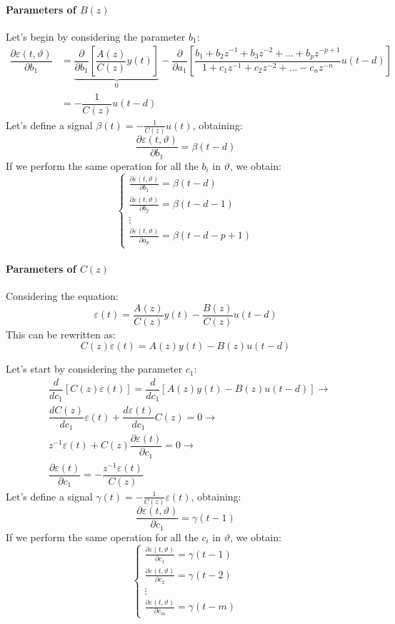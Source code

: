 \paragraph*{Parameters of $B(z)$}
Let's begin by considering the parameter $b_1$:
\begin{align*}
    \dfrac{\partial\varepsilon(t,\vartheta)}{\partial b_1}  &=\underbrace{\dfrac{\partial}{\partial b_1}\left[ \dfrac{A(z)}{C(z)}y(t)\right]}_0 - \dfrac{\partial}{\partial a_1}\left[\dfrac{b_1+b_2z^{-1}+b_3z^{-2}+\dots+b_pz^{-p+1}}{1+c_1z^{-1}+c_2z^{-2}+\dots-c_nz^{-n}}u(t-d)\right] \\        
                                                            &=-\dfrac{1}{C(z)}u(t-d)
\end{align*}
Let's define a signal $\beta(t)=-\frac{1}{C(z)}u(t)$, obtaining: 
\[\dfrac{\partial\varepsilon(t,\vartheta)}{\partial b_1}=\beta(t-d)\]
If we perform the same operation for all the $b_i$ in $\vartheta$, we obtain:
\[\begin{cases}
    \frac{\partial\varepsilon(t,\vartheta)}{\partial b_1}=\beta(t-d) \\
    \frac{\partial\varepsilon(t,\vartheta)}{\partial b_2}=\beta(t-d-1) \\
    \vdots \\
    \frac{\partial\varepsilon(t,\vartheta)}{\partial a_p}=\beta(t-d-p+1)
\end{cases}\]

\paragraph*{Parameters of $C(z)$}
Considering the equation:
\[\varepsilon(t)=\dfrac{A(z)}{C(z)}y(t)-\dfrac{B(z)}{C(z)}u(t-d)\]
This can be rewritten as: 
\[C(z)\varepsilon(t)=A(z)y(t)-B(z)u(t-d)\]

Let's start by considering the parameter $c_1$:
\begin{align*}
    &\dfrac{d}{d c_1}\left[ C(z)\varepsilon(t) \right]=\dfrac{d}{dc_1}\left[ A(z)y(t)-B(z)u(t-d) \right] \rightarrow \\
    &\dfrac{dC(z)}{d c_1}\varepsilon(t) + \dfrac{d\varepsilon(t)}{d c_1}C(z)= 0 \rightarrow \\
    &z^{-1}\varepsilon(t)+C(z)\dfrac{\partial\varepsilon(t)}{\partial c_1} = 0 \rightarrow \\
    &\dfrac{\partial\varepsilon(t)}{\partial c_1}=-\dfrac{z^{-1}\varepsilon(t)}{C(z)}
\end{align*}
Let's define a signal $\gamma(t)=-\frac{1}{C(z)}\varepsilon(t)$, obtaining:
\[\dfrac{\partial\varepsilon(t,\vartheta)}{\partial c_1}=\gamma(t-1)\]
If we perform the same operation for all the $c_i$ in $\vartheta$, we obtain:
\[\begin{cases}
    \frac{\partial\varepsilon(t,\vartheta)}{\partial c_1}=\gamma(t-1) \\
    \frac{\partial\varepsilon(t,\vartheta)}{\partial c_2}=\gamma(t-2) \\
    \vdots \\
    \frac{\partial\varepsilon(t,\vartheta)}{\partial c_m}=\gamma(t-m)
\end{cases}\]

